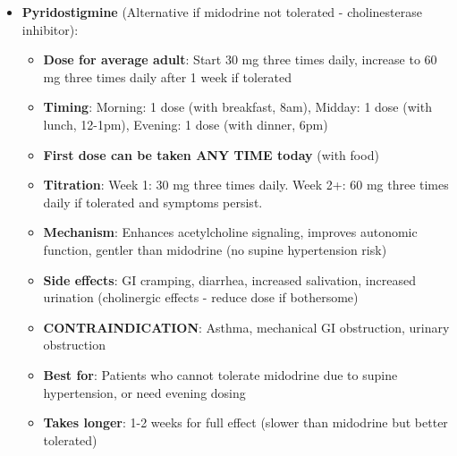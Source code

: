 \begin{enumerate}
\begin{itemize}
        \item \textbf{Pyridostigmine} (Alternative if midodrine not tolerated - cholinesterase inhibitor):
        \begin{itemize}
            \item \textbf{Dose for average adult}: Start 30 mg three times daily, increase to 60 mg three times daily after 1 week if tolerated
            \item \textbf{Timing}: Morning: 1 dose (with breakfast, 8am), Midday: 1 dose (with lunch, 12-1pm), Evening: 1 dose (with dinner, 6pm)
            \item \textbf{First dose can be taken ANY TIME today} (with food)
            \item \textbf{Titration}: Week 1: 30 mg three times daily. Week 2+: 60 mg three times daily if tolerated and symptoms persist.
            \item \textbf{Mechanism}: Enhances acetylcholine signaling, improves autonomic function, gentler than midodrine (no supine hypertension risk)
            \item \textbf{Side effects}: GI cramping, diarrhea, increased salivation, increased urination (cholinergic effects - reduce dose if bothersome)
            \item \textbf{CONTRAINDICATION}: Asthma, mechanical GI obstruction, urinary obstruction
            \item \textbf{Best for}: Patients who cannot tolerate midodrine due to supine hypertension, or need evening dosing
            \item \textbf{Takes longer}: 1-2 weeks for full effect (slower than midodrine but better tolerated)
        \end{itemize}


\end{itemize}
\end{enumerate}
